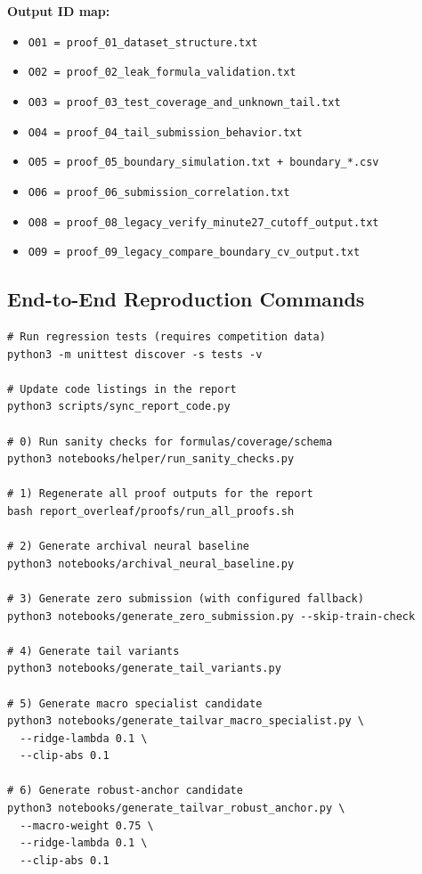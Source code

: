 \textbf{Output ID map:}
\begin{itemize}[leftmargin=1.5em]
  \item \texttt{O01 = proof\_01\_dataset\_structure.txt}
  \item \texttt{O02 = proof\_02\_leak\_formula\_validation.txt}
  \item \texttt{O03 = proof\_03\_test\_coverage\_and\_unknown\_tail.txt}
  \item \texttt{O04 = proof\_04\_tail\_submission\_behavior.txt}
  \item \texttt{O05 = proof\_05\_boundary\_simulation.txt + boundary\_*.csv}
  \item \texttt{O06 = proof\_06\_submission\_correlation.txt}
  \item \texttt{O08 = proof\_08\_legacy\_verify\_minute27\_cutoff\_output.txt}
  \item \texttt{O09 = proof\_09\_legacy\_compare\_boundary\_cv\_output.txt}
\end{itemize}
\normalsize

\subsection{End-to-End Reproduction Commands}
\begin{Verbatim}[fontsize=\small]
# Run regression tests (requires competition data)
python3 -m unittest discover -s tests -v

# Update code listings in the report
python3 scripts/sync_report_code.py

# 0) Run sanity checks for formulas/coverage/schema
python3 notebooks/helper/run_sanity_checks.py

# 1) Regenerate all proof outputs for the report
bash report_overleaf/proofs/run_all_proofs.sh

# 2) Generate archival neural baseline
python3 notebooks/archival_neural_baseline.py

# 3) Generate zero submission (with configured fallback)
python3 notebooks/generate_zero_submission.py --skip-train-check

# 4) Generate tail variants
python3 notebooks/generate_tail_variants.py

# 5) Generate macro specialist candidate
python3 notebooks/generate_tailvar_macro_specialist.py \
  --ridge-lambda 0.1 \
  --clip-abs 0.1

# 6) Generate robust-anchor candidate
python3 notebooks/generate_tailvar_robust_anchor.py \
  --macro-weight 0.75 \
  --ridge-lambda 0.1 \
  --clip-abs 0.1
\end{Verbatim}
